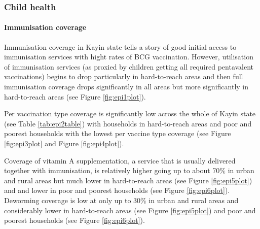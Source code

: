 \documentclass[12pt,a4paper]{article}
\let\oldparagraph\paragraph
\renewcommand{\paragraph}[1]{\oldparagraph{#1}\mbox{}}
\begin{document}
\hypertarget{chealth-results}{%
\subsubsection{Child health}\label{chealth-results}}

\hypertarget{epi-results}{%
\paragraph{Immunisation coverage}\label{epi-results}}

Immunisation coverage in Kayin state tells a story of good initial access to immunisation services with hight rates of BCG vaccination. However, utilisation of immunisation services (as proxied by children getting all required pentavalent vaccinations) begins to drop particularly in hard-to-reach areas and then full immunisation coverage drops significantly in all areas but more significantly in hard-to-reach areas (see Figure \ref{fig:epi1plot}).

Per vaccination type coverage is significantly low across the whole of Kayin state (see Table \ref{tab:epi2table}) with households in hard-to-reach areas and poor and poorest households with the lowest per vaccine type coverage (see Figure \ref{fig:epi3plot} and Figure \ref{fig:epi4plot}).

Coverage of vitamin A supplementation, a service that is usually delivered together with immunisation, is relatively higher going up to about 70\% in urban and rural areas but much lower in hard-to-reach areas (see Figure \ref{fig:epi5plot}) and and lower in poor and poorest households (see Figure \ref{fig:epi6plot}). Deworming coverage is low at only up to 30\% in urban and rural areas and considerably lower in hard-to-reach areas (see Figure \ref{fig:epi5plot}) and poor and poorest households (see Figure \ref{fig:epi6plot}).
\end{document}
